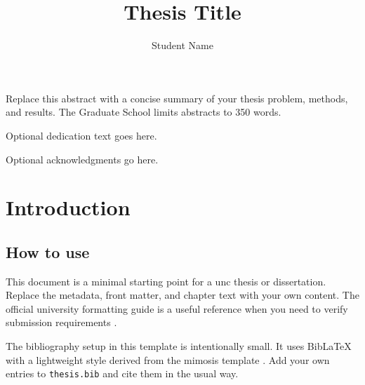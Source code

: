 \documentclass[11pt]{uncthesis}
\title{Thesis Title}
\author{Student Name}
\begin{document}
\frontmatter

\maketitlepage
\makecopyrightpage

\begin{uncabstract}
  Replace this abstract with a concise summary of your thesis problem,
  methods, and results. The Graduate School limits abstracts to 350 words.
\end{uncabstract}

\begin{uncdedication}
  Optional dedication text goes here.
\end{uncdedication}

\begin{uncacknowledgments}
  Optional acknowledgments go here.
\end{uncacknowledgments}


\tableofcontents
\listoftables
\listoffigures
\makelistofabbreviations

\mainmatter

\chapter{Introduction}

\section{How to use}

This document is a minimal starting point for a \gls{unc} thesis or
dissertation. Replace the metadata, front matter, and chapter text with
your own content. The official university formatting guide is a useful
reference when you need to verify submission requirements
\cite{unc-dissertation-guide}.

The bibliography setup in this template is intentionally small. It uses
BibLaTeX with a lightweight style derived from the mimosis template
\cite{mimosis-template}. Add your own entries to \texttt{thesis.bib}
and cite them in the usual way.
\end{document}
